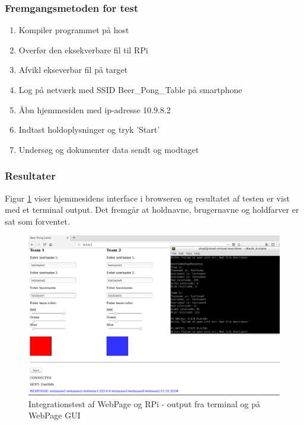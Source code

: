 \documentclass[Integrationstest/Integrationstest_main.tex]{subfiles}
\begin{document}
\subsubsection{Fremgangsmetoden for test}
\begin{enumerate}
    \item Kompiler programmet på host
    \item Overfør den eksekverbare fil til RPi 
    \item Afvikl ekseverbar fil på target
    \item Log på netværk med SSID Beer\_Pong\_Table på smartphone
    \item Åbn hjemmesiden med ip-adresse 10.9.8.2
    \item Indtast holdoplysninger og tryk 'Start'
    \item Undersøg og dokumenter data sendt og modtaget 
\end{enumerate}

\subsubsection{Resultater}
Figur \ref{fig:Integration_3} viser hjemmesidens interface i browseren og resultatet af testen er vist med et terminal output. Det fremgår at holdnavne, brugernavne og holdfarver er sat som forventet.

\begin{figure}[H]
    \centering
    \includegraphics[width=1\textwidth]{Integrationstest/WebPageogRPi/graphics/webserver.png}
    \caption{Integrationstest af WebPage og RPi - output fra terminal og på WebPage GUI}
    \label{fig:Integration_3}
\end{figure}
\end{document}
